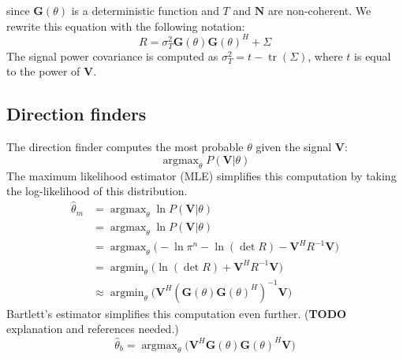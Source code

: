 \documentclass[letter]{article}
\DeclareMathOperator*{\argmax}{argmax}
\DeclareMathOperator*{\argmin}{argmin}
\DeclareMathOperator*{\trace}{tr}
\begin{document}
since $\mathbf{G}(\theta)$ is a deterministic function and $T$ and $\mathbf{N}$ are non-coherent. 
We rewrite this equation with the following notation: 
\begin{equation}
    R = \sigma_T^2\mathbf{G}(\theta)\mathbf{G}(\theta)^H + \Sigma
\end{equation}
The signal power covariance is computed as $\sigma_T^2 = t - \trace{(\Sigma)}$, where 
$t$ is equal to the power of $\mathbf{V}$. 



  \subsection{Direction finders}
The direction finder computes the most probable $\theta$ given the signal $\mathbf{V}$:
$$ \argmax_\theta{P( \mathbf{V} | \theta )}$$
The maximum likelihood estimator (MLE) simplifies this computation by taking the log-likelihood 
of this distribution. 
\begin{equation}
  \begin{aligned}
    \hat{\theta}_{m} &= \argmax_\theta{ \ln{P(\mathbf{V} | \theta)} } \\
                 &= \argmax_\theta{ \ln{P(\mathbf{V} | \theta)} } \\
                 &= \argmax_\theta{\big( -{\ln{\pi^n}} - \ln{(\det{R})} - 
                      \mathbf{V}^HR^{-1}\mathbf{V} \big)} \\ 
                 &= \argmin_\theta{\big( \ln{(\det{R})} + \mathbf{V}^HR^{-1}\mathbf{V} \big)} \\
                 &\approx \argmin_\theta{\big( \mathbf{V}^H
                    (\mathbf{G}(\theta)\mathbf{G}(\theta)^H)^{-1}
                    \mathbf{V} \big)}
  \end{aligned}
\end{equation}
Bartlett's estimator simplifies this computation even further. (\textbf{TODO} explanation 
and references needed.)
\begin{equation} \label{eq:bartlett}
  \hat{\theta}_b = \argmax_\theta{\big( \mathbf{V}^H
        \mathbf{G}(\theta)\mathbf{G}(\theta)^H\mathbf{V} \big)}
\end{equation}
\end{document}
